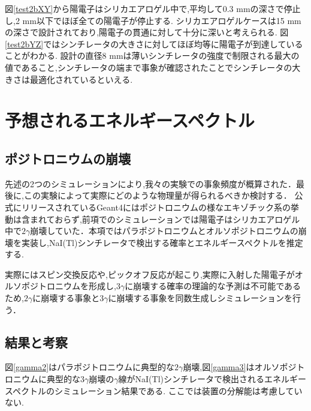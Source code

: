 図\ref{test2bXY}から陽電子はシリカエアロゲル中で,平均して0.3 mmの深さで停止し,2 mm以下でほぼ全ての陽電子が停止する.
シリカエアロゲルケースは15 mmの深さで設計されており,陽電子の貫通に対して十分に深いと考えられる.
図\ref{test2bYZ}ではシンチレータの大きさに対してほぼ均等に陽電子が到達していることがわかる.
設計の直径8 mmは薄いシンチレータの強度で制限される最大の値であること,シンチレータの端まで事象が確認されたことでシンチレータの大きさは最適化されているといえる.


\section{予想されるエネルギースペクトル}
\label{section_test3}

\subsection{ポジトロニウムの崩壊}

先述の2つのシミュレーションにより,我々の実験での事象頻度が概算された．最後に,この実験によって実際にどのような物理量が得られるべきか検討する．
公式にリリースされているGeant4にはポジトロニウムの様なエキゾチック系の挙動は含まれておらず,前項でのシミュレーションでは陽電子はシリカエアロゲル中で$2\gamma$崩壊していた．本項ではパラポジトロニウムとオルソポジトロニウムの崩壊を実装し,NaI(Tl)シンチレータで検出する確率とエネルギースペクトルを推定する.

実際にはスピン交換反応や,ピックオフ反応が起こり,実際に入射した陽電子がオルソポジトロニウムを形成し,$3\gamma$に崩壊する確率の理論的な予測は不可能であるため,$2\gamma$に崩壊する事象と$3\gamma$に崩壊する事象を同数生成しシミュレーションを行う．

\subsection{結果と考察}

図\ref{gamma2}はパラポジトロニウムに典型的な$2\gamma$崩壊,図\ref{gamma3}はオルソポジトロニウムに典型的な$3\gamma$崩壊の$\gamma$線がNaI(Tl)シンチレータで検出されるエネルギースペクトルのシミュレーション結果である.
ここでは装置の分解能は考慮していない.

